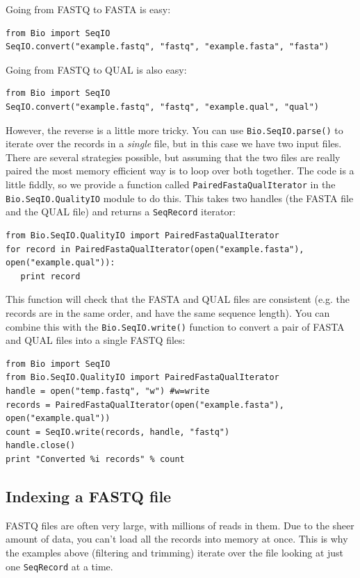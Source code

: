 \documentclass{report}
\begin{document}
Going from FASTQ to FASTA is easy:

\begin{verbatim}
from Bio import SeqIO
SeqIO.convert("example.fastq", "fastq", "example.fasta", "fasta")
\end{verbatim}

Going from FASTQ to QUAL is also easy:

\begin{verbatim}
from Bio import SeqIO
SeqIO.convert("example.fastq", "fastq", "example.qual", "qual")
\end{verbatim}

However, the reverse is a little more tricky. You can use \verb|Bio.SeqIO.parse()|
to iterate over the records in a \emph{single} file, but in this case we have
two input files. There are several strategies possible, but assuming that the
two files are really paired the most memory efficient way is to loop over both
together. The code is a little fiddly, so we provide a function called
\verb|PairedFastaQualIterator| in the \verb|Bio.SeqIO.QualityIO| module to do
this. This takes two handles (the FASTA file and the QUAL file) and returns
a \verb|SeqRecord| iterator:

\begin{verbatim}
from Bio.SeqIO.QualityIO import PairedFastaQualIterator
for record in PairedFastaQualIterator(open("example.fasta"), open("example.qual")):
   print record
\end{verbatim}

This function will check that the FASTA and QUAL files are consistent (e.g.
the records are in the same order, and have the same sequence length).
You can combine this with the \verb|Bio.SeqIO.write()| function to convert a
pair of FASTA and QUAL files into a single FASTQ files:

\begin{verbatim}
from Bio import SeqIO
from Bio.SeqIO.QualityIO import PairedFastaQualIterator
handle = open("temp.fastq", "w") #w=write
records = PairedFastaQualIterator(open("example.fasta"), open("example.qual"))
count = SeqIO.write(records, handle, "fastq")
handle.close()
print "Converted %i records" % count
\end{verbatim}

\subsection{Indexing a FASTQ file}
\label{sec:fastq-indexing}

FASTQ files are often very large, with millions of reads in them. Due to the
sheer amount of data, you can't load all the records into memory at once.
This is why the examples above (filtering and trimming) iterate over the file
looking at just one \verb|SeqRecord| at a time.
\end{document}
